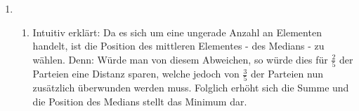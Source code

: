 \documentclass[a4paper]{scrartcl}
\newtheorem*{behaupt}{Behauptung}
\newcommand{\gdw}{\Leftrightarrow}
\def \blattnr {6}
\begin{document}
\begin{enumerate}[label=\bfseries \blattnr.\arabic*]
\begin{enumerate}
    \item 
        \begin{behaupt}
            Für die Quantile der Exponentialverteilung gelten
            \begin{equation*}
                x_p = -\frac{1}{\lambda} \cdot \ln(1-p)
                \text{ für }
                p \in (0,1)
            \end{equation*}
        \end{behaupt}
        \begin{proof}
            Sei $p \in (0,1)$. Es gilt
            \begin{equation*}
                x_p = \inf \{t \in \mathbb{R} : F(t) \geq p\}
                \text{ .}
            \end{equation*}
            Da die Verteilungsfunktion $F$ jeden Wert in $(0,1)$ genau einmal
            annimmt, gibt es ein $t$ mit $F(t) = p$. Da $F$ monoton steigend
            ist, ist diese $t$ das gesuchte Quantil $x_p$.
            \begin{equation*}
                \begin{alignedat}{2}
                    && F(t) &= p \\
                    \gdw\ && 1 - e^{-\lambda t} &= p \\
                    \gdw\ && e^{-\lambda t} &= 1 - p \\
                    \gdw\ && -\lambda t &= \ln(1 - p) \\
                    \gdw\ && t &= -\frac{1}{\lambda} \cdot \ln(1 - p) \\
                    \gdw\ && x_p &= -\frac{1}{\lambda} \cdot \ln(1 - p)
                \end{alignedat}
            \end{equation*}
        \end{proof}

\end{enumerate}


\item 

\begin{enumerate}
 \item 
 Intuitiv erklärt: Da es sich um eine ungerade Anzahl an Elementen handelt, ist die Position des mittleren Elementes - des Medians - zu wählen.
 Denn: Würde man von diesem Abweichen, so würde dies für $\frac25$ der Parteien eine Distanz sparen, welche jedoch von $\frac35$ der Parteien 
 nun zusätzlich überwunden werden muss. Folglich erhöht sich die Summe und die Position des Medians stellt das Minimum dar.
 

\end{enumerate}
\end{enumerate}
\end{document}
